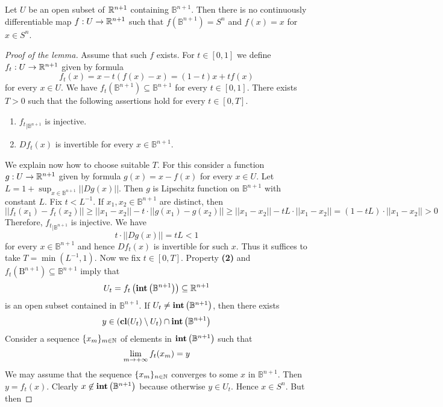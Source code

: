 \documentclass[10pt]{amsart}
\begin{document}
\begin{lemma}\label{lemma:thereisnodifferentiableretraction}
Let $U$ be an open subset of ${\mathbb R}^{n+1}$ containing $\mathbb{B}^{n+1}$. Then there is no continuously differentiable map $f:U\rightarrow {\mathbb R}^{n+1}$ such that $f(\mathbb{B}^{n+1}) = S^{n}$ and $f(x) = x$ for $x\in S^n$. 
\end{lemma}
\begin{proof}[Proof of the lemma]
Assume that such $f$ exists. For $t\in [0,1]$ we define $f_t:U\rightarrow {\mathbb R}^{n+1}$ given by formula
$$f_t(x) = x - t(f(x) - x) = (1-t)x + tf(x)$$
for every $x\in U$. We have $f_t\left(\mathbb{B}^{n+1}\right) \subseteq \mathbb{B}^{n+1}$ for every $t\in [0,1]$. There exists $T>0$ such that the following assertions hold for every $t\in [0,T]$.
\begin{enumerate}[label=\textbf{(\arabic*)}, leftmargin=3.0em]
\item ${f_t}_{\mid \mathbb{B}^{n+1}}$ is injective.
\item $Df_t(x)$ is invertible for every $x\in \mathbb{B}^{n+1}$.
\end{enumerate}
We explain now how to choose suitable $T$. For this consider a function $g:U\rightarrow {\mathbb R}^{n+1}$ given by formula $g(x)= x - f(x)$ for every $x\in U$. Let $L = 1 + \sup_{x\in \mathbb{B}^{n+1}}||Dg(x)||$. Then $g$ is Lipschitz function on $\mathbb{B}^{n+1}$ with constant $L$. Fix $t < L^{-1}$. If $x_1,x_2\in \mathbb{B}^{n+1}$ are distinct, then
$$||f_t(x_1) - f_t(x_2)|| \geq ||x_1-x_2|| - t\cdot ||g(x_1) - g(x_2)|| \geq ||x_1 - x_2|| - tL\cdot ||x_1 - x_2|| = \left(1 - tL\right)\cdot ||x_1 - x_2|| > 0 $$
Therefore, ${f_t}_{\mid \mathbb{B}^{n+1}}$ is injective. We have
$$t\cdot ||Dg(x)|| = tL < 1$$
for every $x\in \mathbb{B}^{n+1}$ and hence $Df_t(x)$ is invertible for such $x$. Thus it suffices to take $T = \min \left(L^{-1}, 1 \right)$. Now we fix $t\in [0,T]$. Property \textbf{(2)} and $f_t\left(\mathrm{B}^{n+1}\right) \subseteq  \mathbb{B}^{n+1}$ imply that
$$U_t = f_t\left(\mathbf{int}\left(\mathbb{B}^{n+1}\right)\right)\subseteq {\mathbb R}^{n+1}$$
is an open subset contained in $\mathbb{B}^{n+1}$. If $U_t \neq \mathbf{int}\left(\mathbb{B}^{n+1}\right)$, then there exists
$$y \in \left(\mathbf{cl}(U_t) \setminus U_t\right) \cap \mathbf{int}\left(\mathbb{B}^{n+1}\right)$$
Consider a sequence $\{x_m\}_{m\in {\mathbb N}}$ of elements in $\mathbf{int}\left(\mathbb{B}^{n+1}\right)$ such that
$$\lim_{m\rightarrow +\infty}f_t(x_m) = y$$
We may assume that the sequence $\{x_m\}_{n\in {\mathbb N}}$ converges to some $x$ in $\mathbb{B}^{n+1}$. Then $y = f_t(x)$. Clearly $x \not \in \mathbf{int}\left(\mathbb{B}^{n+1}\right)$ because otherwise $y \in U_t$. Hence $x\in S^n$. But then

\end{proof}
\end{document}
